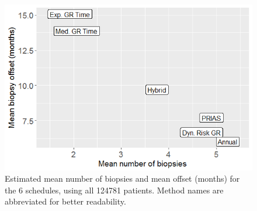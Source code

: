 \begin{figure}
\centerline{\includegraphics[width=\columnwidth]{images/sim_study/meanNbVsOffset_all.png}}
\caption{Estimated mean number of biopsies and mean offset (months) for the 6 schedules, using all 124781 patients. Method names are abbreviated for better readability.}
\label{fig : meanNbVsOffset}
\end{figure}

